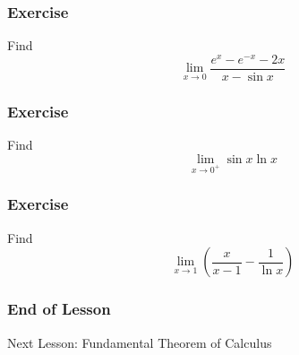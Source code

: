 \documentclass[xcolor=dvipsnames]{beamer}
\begin{document}
\begin{frame}
  \frametitle{Exercise}
  {\ubung} Find
  \begin{equation}
    \label{eq:taihahri}
    \lim_{x\rightarrow{}0}\frac{e^{x}-e^{-x}-2x}{x-\sin{}x}
  \end{equation}
\end{frame}

\begin{frame}
  \frametitle{Exercise}
  {\ubung} Find
  \begin{equation}
    \label{eq:eemeeyae}
    \lim_{x\rightarrow{}0^{+}}\sin{}x\ln{}x
  \end{equation}
\end{frame}

\begin{frame}
  \frametitle{Exercise}
  {\ubung} Find
  \begin{equation}
    \label{eq:gasuchoh}
    \lim_{x\rightarrow{}1}\left(\frac{x}{x-1}-\frac{1}{\ln{}x}\right)
  \end{equation}
\end{frame}

\begin{frame}
  \frametitle{End of Lesson}
Next Lesson: Fundamental Theorem of Calculus
\end{frame}
\end{document}

